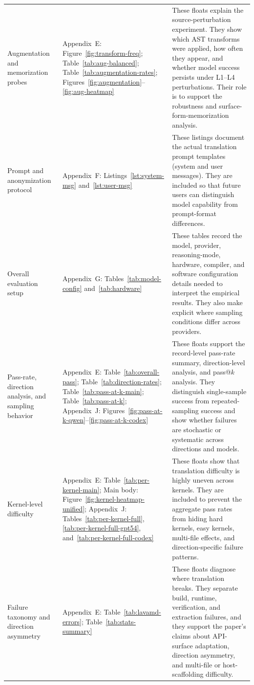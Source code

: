 \begin{center}
\begin{tabularx}{0.98\textwidth}{@{}
>{\RaggedRight\arraybackslash}p{}
>{\RaggedRight\arraybackslash}p{}
X
@{}}
Augmentation and memorization probes
&
Appendix~E:
Figure~\ref{fig:transform-freq};
Table~\ref{tab:aug-balanced};
Table~\ref{tab:augmentation-rates};
Figures~\ref{fig:augmentation}--\ref{fig:aug-heatmap}
&
These floats explain the source-perturbation experiment. They show which AST
transforms were applied, how often they appear, and whether model success persists
under L1--L4 perturbations. Their role is to support the robustness and
surface-form-memorization analysis. \\

Prompt and anonymization protocol
&
Appendix~F:
Listings~\ref{lst:system-msg} and~\ref{lst:user-msg}
&
These listings document the actual translation prompt templates (system and user messages). They are included so that future users can distinguish model capability from prompt-format differences. \\

Overall evaluation setup
&
Appendix~G:
Tables~\ref{tab:model-config} and~\ref{tab:hardware}
&
These tables record the model, provider, reasoning-mode, hardware, compiler, and
software configuration details needed to interpret the empirical results. They also
make explicit where sampling conditions differ across providers. \\

Pass-rate, direction analysis, and sampling behavior
&
Appendix~E:
Table~\ref{tab:overall-pass};
Table~\ref{tab:direction-rates};
Table~\ref{tab:pass-at-k-main};
Table~\ref{tab:pass-at-k};
Appendix~J:
Figures~\ref{fig:pass-at-k-qwen}--\ref{fig:pass-at-k-codex}
&
These floats support the record-level pass-rate summary, direction-level analysis, and pass@$k$ analysis. They distinguish single-sample success from repeated-sampling success and show whether failures are stochastic or systematic across directions and models. \\

Kernel-level difficulty
&
Appendix~E:
Table~\ref{tab:per-kernel-main};
Main body: Figure~\ref{fig:kernel-heatmap-unified}; Appendix~J: Tables~\ref{tab:per-kernel-full}, \ref{tab:per-kernel-full-gpt54}, and~\ref{tab:per-kernel-full-codex}
&
These floats show that translation difficulty is highly uneven across kernels.
They are included to prevent the aggregate pass rates from hiding hard kernels,
easy kernels, multi-file effects, and direction-specific failure patterns. \\

Failure taxonomy and direction asymmetry
&
Appendix~E:
Table~\ref{tab:lavamd-errors};
Table~\ref{tab:stats-summary}
&
These floats diagnose where translation breaks. They separate build, runtime,
verification, and extraction failures, and they support the paper's claims about
API-surface adaptation, direction asymmetry, and multi-file or host-scaffolding
difficulty. \\


\end{tabularx}
\end{center}
